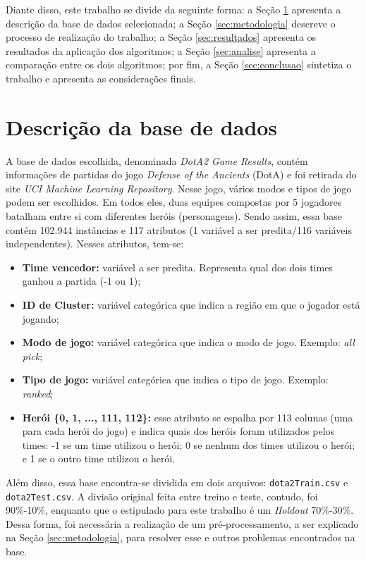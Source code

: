 \documentclass[12pt]{article}
\begin{document}
Diante disso, este trabalho se divide da seguinte forma: a Seção \ref{sec:descricao} apresenta a descrição da base de dados selecionada; a Seção \ref{sec:metodologia} descreve o processo de realização do trabalho; a Seção \ref{sec:resultados} apresenta os resultados da aplicação dos algoritmos; a Seção \ref{sec:analise} apresenta a comparação entre os dois algoritmos; por fim, a Seção \ref{sec:conclusao} sintetiza o trabalho e apresenta as considerações finais.

\section{Descrição da base de dados}\label{sec:descricao}
A base de dados escolhida, denominada \textit{DotA2 Game Results}, contém informações de partidas do jogo \textit{Defense of the Ancients} (DotA) e foi retirada do site \textit{UCI Machine Learning Repository}. Nesse jogo, vários modos e tipos de jogo podem ser escolhidos. Em todos eles, duas equipes compostas por 5 jogadores batalham entre si com diferentes heróis (personagens). Sendo assim, essa base contém 102.944 instâncias e 117 atributos (1 variável a ser predita/116 variáveis independentes). Nesses atributos, tem-se:

\begin{itemize}
	\item{\textbf{Time vencedor:}} variável a ser predita. Representa qual dos dois times ganhou a partida (-1 ou 1);
	\item{\textbf{ID de Cluster:}} variável categórica que indica a região em que o jogador está jogando; 
	\item{\textbf{Modo de jogo:}} variável categórica que indica o modo de jogo. Exemplo: \textit{all pick};
	\item{\textbf{Tipo de jogo:}} variável categórica que indica o tipo de jogo. Exemplo: \textit{ranked};
	\item{\textbf{Herói \{0, 1, ..., 111, 112\}:}} esse atributo se espalha por 113 colunas (uma para cada herói do jogo) e indica quais dos heróis foram utilizados pelos times: -1 se um time utilizou o herói; 0 se nenhum dos times utilizou o herói; e 1 se o outro time utilizou o herói.
\end{itemize}

Além disso, essa base encontra-se dividida em dois arquivos: \texttt{dota2Train.csv} e \texttt{dota2Test.csv}. A divisão original feita entre treino e teste, contudo, foi 90\%-10\%, enquanto que o estipulado para este trabalho é um \textit{Holdout} 70\%-30\%. Dessa forma, foi necessária a realização de um pré-processamento, a ser explicado na Seção \ref{sec:metodologia}, para resolver esse e outros problemas encontrados na base. 
\end{document}
